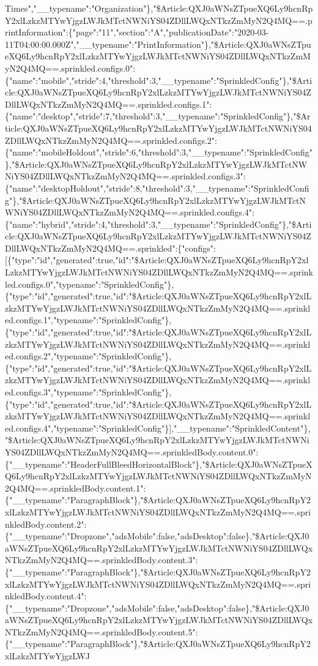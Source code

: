 Times","\_\_typename":"Organization"\},"\$Article:QXJ0aWNsZTpueXQ6Ly9hcnRpY2xlLzkzMTYwYjgzLWJkMTctNWNiYS04ZDllLWQxNTkzZmMyN2Q4MQ==.printInformation":\{"page":"11","section":"A","publicationDate":"2020-03-11T04:00:00.000Z","\_\_typename":"PrintInformation"\},"\$Article:QXJ0aWNsZTpueXQ6Ly9hcnRpY2xlLzkzMTYwYjgzLWJkMTctNWNiYS04ZDllLWQxNTkzZmMyN2Q4MQ==.sprinkled.configs.0":\{"name":"mobile","stride":4,"threshold":3,"\_\_typename":"SprinkledConfig"\},"\$Article:QXJ0aWNsZTpueXQ6Ly9hcnRpY2xlLzkzMTYwYjgzLWJkMTctNWNiYS04ZDllLWQxNTkzZmMyN2Q4MQ==.sprinkled.configs.1":\{"name":"desktop","stride":7,"threshold":3,"\_\_typename":"SprinkledConfig"\},"\$Article:QXJ0aWNsZTpueXQ6Ly9hcnRpY2xlLzkzMTYwYjgzLWJkMTctNWNiYS04ZDllLWQxNTkzZmMyN2Q4MQ==.sprinkled.configs.2":\{"name":"mobileHoldout","stride":6,"threshold":3,"\_\_typename":"SprinkledConfig"\},"\$Article:QXJ0aWNsZTpueXQ6Ly9hcnRpY2xlLzkzMTYwYjgzLWJkMTctNWNiYS04ZDllLWQxNTkzZmMyN2Q4MQ==.sprinkled.configs.3":\{"name":"desktopHoldout","stride":8,"threshold":3,"\_\_typename":"SprinkledConfig"\},"\$Article:QXJ0aWNsZTpueXQ6Ly9hcnRpY2xlLzkzMTYwYjgzLWJkMTctNWNiYS04ZDllLWQxNTkzZmMyN2Q4MQ==.sprinkled.configs.4":\{"name":"hybrid","stride":4,"threshold":3,"\_\_typename":"SprinkledConfig"\},"\$Article:QXJ0aWNsZTpueXQ6Ly9hcnRpY2xlLzkzMTYwYjgzLWJkMTctNWNiYS04ZDllLWQxNTkzZmMyN2Q4MQ==.sprinkled":\{"configs":{[}\{"type":"id","generated":true,"id":"\$Article:QXJ0aWNsZTpueXQ6Ly9hcnRpY2xlLzkzMTYwYjgzLWJkMTctNWNiYS04ZDllLWQxNTkzZmMyN2Q4MQ==.sprinkled.configs.0","typename":"SprinkledConfig"\},\{"type":"id","generated":true,"id":"\$Article:QXJ0aWNsZTpueXQ6Ly9hcnRpY2xlLzkzMTYwYjgzLWJkMTctNWNiYS04ZDllLWQxNTkzZmMyN2Q4MQ==.sprinkled.configs.1","typename":"SprinkledConfig"\},\{"type":"id","generated":true,"id":"\$Article:QXJ0aWNsZTpueXQ6Ly9hcnRpY2xlLzkzMTYwYjgzLWJkMTctNWNiYS04ZDllLWQxNTkzZmMyN2Q4MQ==.sprinkled.configs.2","typename":"SprinkledConfig"\},\{"type":"id","generated":true,"id":"\$Article:QXJ0aWNsZTpueXQ6Ly9hcnRpY2xlLzkzMTYwYjgzLWJkMTctNWNiYS04ZDllLWQxNTkzZmMyN2Q4MQ==.sprinkled.configs.3","typename":"SprinkledConfig"\},\{"type":"id","generated":true,"id":"\$Article:QXJ0aWNsZTpueXQ6Ly9hcnRpY2xlLzkzMTYwYjgzLWJkMTctNWNiYS04ZDllLWQxNTkzZmMyN2Q4MQ==.sprinkled.configs.4","typename":"SprinkledConfig"\}{]},"\_\_typename":"SprinkledContent"\},"\$Article:QXJ0aWNsZTpueXQ6Ly9hcnRpY2xlLzkzMTYwYjgzLWJkMTctNWNiYS04ZDllLWQxNTkzZmMyN2Q4MQ==.sprinkledBody.content.0":\{"\_\_typename":"HeaderFullBleedHorizontalBlock"\},"\$Article:QXJ0aWNsZTpueXQ6Ly9hcnRpY2xlLzkzMTYwYjgzLWJkMTctNWNiYS04ZDllLWQxNTkzZmMyN2Q4MQ==.sprinkledBody.content.1":\{"\_\_typename":"ParagraphBlock"\},"\$Article:QXJ0aWNsZTpueXQ6Ly9hcnRpY2xlLzkzMTYwYjgzLWJkMTctNWNiYS04ZDllLWQxNTkzZmMyN2Q4MQ==.sprinkledBody.content.2":\{"\_\_typename":"Dropzone","adsMobile":false,"adsDesktop":false\},"\$Article:QXJ0aWNsZTpueXQ6Ly9hcnRpY2xlLzkzMTYwYjgzLWJkMTctNWNiYS04ZDllLWQxNTkzZmMyN2Q4MQ==.sprinkledBody.content.3":\{"\_\_typename":"ParagraphBlock"\},"\$Article:QXJ0aWNsZTpueXQ6Ly9hcnRpY2xlLzkzMTYwYjgzLWJkMTctNWNiYS04ZDllLWQxNTkzZmMyN2Q4MQ==.sprinkledBody.content.4":\{"\_\_typename":"Dropzone","adsMobile":false,"adsDesktop":false\},"\$Article:QXJ0aWNsZTpueXQ6Ly9hcnRpY2xlLzkzMTYwYjgzLWJkMTctNWNiYS04ZDllLWQxNTkzZmMyN2Q4MQ==.sprinkledBody.content.5":\{"\_\_typename":"ParagraphBlock"\},"\$Article:QXJ0aWNsZTpueXQ6Ly9hcnRpY2xlLzkzMTYwYjgzLWJ